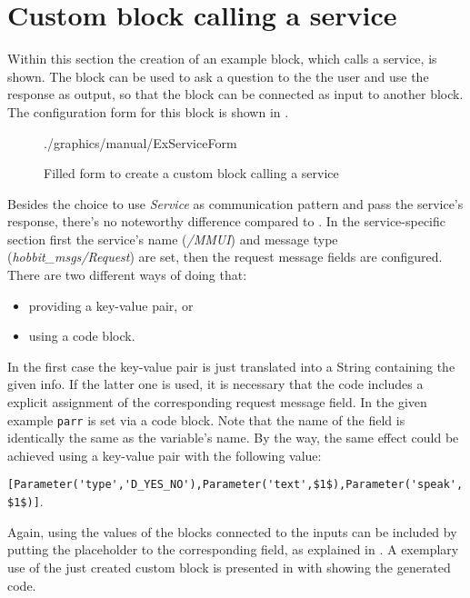 \section{Custom block calling a service}
Within this section the creation of an example block, which calls a service, is shown. The block can be used to ask a question to the the user and use the response as output, so that the block can be connected as input to another block. The configuration form for this block is shown in .

\begin{figure}[ht]
	\centering
	\begin{overpic}[width=\linewidth]{./graphics/manual/ExServiceForm}
	\end{overpic}
	\caption{Filled form to create a custom block calling a service}%
	\label{fig:ExServiceForm}%
\end{figure}

Besides the choice to use \textit{Service} as communication pattern and pass the service's response, there's no noteworthy difference compared to . In the service-specific section first the service's name (\textit{/MMUI}) and message type (\textit{hobbit\_msgs/Request}) are set, then the request message fields are configured. There are two different ways of doing that:

\begin{itemize}
	\item providing a key-value pair, or
	\item using a code block.
\end{itemize}

In the first case the key-value pair is just translated into a String containing the given info. If the latter one is used, it is necessary that the code includes a explicit assignment of the corresponding request message field. In the given example \lstinline!parr! is set via a code block. Note that the name of the field is identically the same as the variable's name. By the way, the same effect could be achieved using a key-value pair with the following value: 

\lstinline![Parameter('type','D_YES_NO'),Parameter('text',$1$),Parameter('speak',$1$)]!.

Again, using the values of the blocks connected to the inputs can be included by putting the placeholder to the corresponding field, as explained in . A exemplary use of the just created custom block is presented in  with  showing the generated code.

